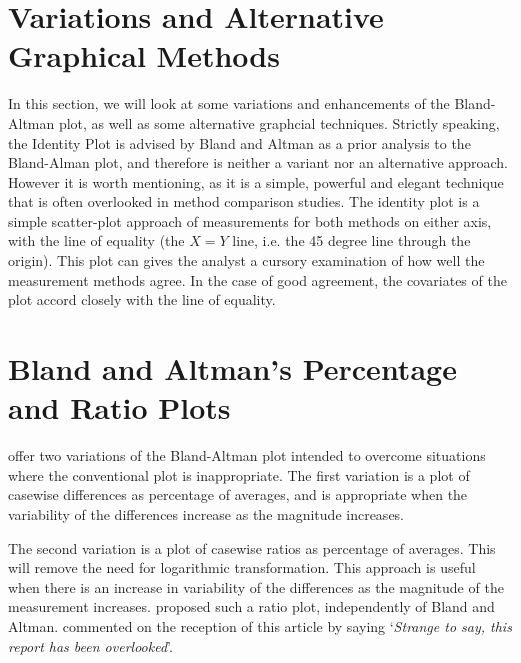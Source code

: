 \documentclass[12pt, a4paper]{report}
\theoremstyle{plain}
\theoremstyle{definition}
\theoremstyle{remark}
\begin{document}
	\section{Variations and Alternative Graphical Methods}
	In this section, we will look at some variations and enhancements of the Bland-Altman plot, as well as some alternative graphcial techniques. Strictly speaking, the Identity Plot is advised by Bland and Altman as a prior analysis to the Bland-Alman plot, and therefore is neither a variant nor an alternative approach. However it is worth mentioning, as it is a simple, powerful and elegant technique that is often overlooked in method comparison studies. The identity plot is a simple scatter-plot approach of measurements for both methods on either axis, with the line of equality (the $X=Y$ line, i.e. the 45 degree line through the origin). This plot can gives the analyst a cursory examination of how well the measurement methods agree. In the case of good agreement, the covariates of the plot accord closely with the line of equality.
	

	
	\section*{Bland and Altman's Percentage and Ratio Plots}
	\citet{BA99} offer two variations of the Bland-Altman plot intended to overcome situations where the conventional plot is inappropriate. The first variation is a plot of casewise differences as percentage of averages, and is appropriate when the variability of the differences increase as the
	magnitude increases. 
	
	The second variation is a plot of casewise ratios as percentage of averages. This will remove the need for
	logarithmic transformation. This approach is useful when there is an increase in variability of the differences as the magnitude of the measurement increases. \citet{Eksborg} proposed such a ratio plot,
	independently of Bland and Altman. \citet{Dewitte} commented on
	the reception of this article by saying `\textit{Strange to say, this 
		report has been overlooked}'.
	
\end{document}
